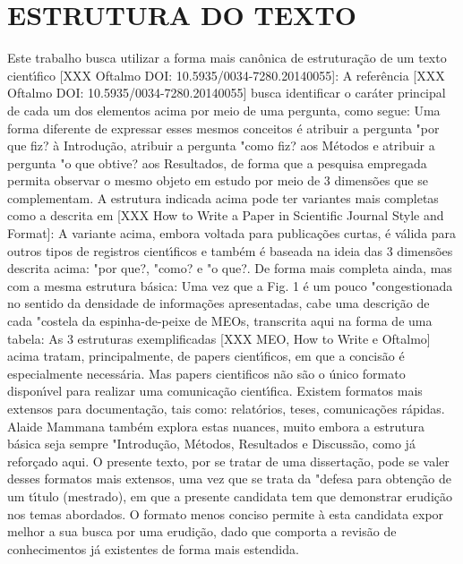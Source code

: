 \documentclass[
12pt,		%
openright,	%
twoside,  %
a4paper,			%
chapter=TITLE,		%
english,			%
french,				%
spanish,			%
brazil				%
]{USPSC-classe/USPSC}
\begin{document}


\chapter[ESTRUTURA DO TEXTO]{ESTRUTURA DO TEXTO}\label{ESTRUTURA DO TEXTO}
Este trabalho busca utilizar a forma mais can\^onica de estrutura\c{c}\~ao de um texto cient\'{\i}fico [XXX Oftalmo DOI: 10.5935/0034-7280.20140055]:
A refer\^encia [XXX Oftalmo DOI: 10.5935/0034-7280.20140055] busca identificar o car\'ater principal de cada um dos elementos acima por meio de uma pergunta, como segue:
Uma forma diferente de expressar esses mesmos conceitos \'e atribuir a pergunta "por que fiz? \`a Introdu\c{c}\~ao, atribuir a pergunta "como fiz? aos M\'etodos e atribuir a pergunta "o que obtive? aos Resultados, de forma que a pesquisa empregada permita observar o mesmo objeto em estudo por meio de 3 dimens\~oes que se complementam. 
A estrutura indicada acima pode ter variantes mais completas como a descrita em [XXX How to Write a Paper in Scientific Journal Style and Format]:
A variante acima, embora voltada para publica\c{c}\~oes curtas, \'e v\'alida para outros tipos de registros cient\'{\i}ficos e tamb\'em \'e baseada na ideia das 3 dimens\~oes descrita acima: "por que?, "como? e "o que?. 
De forma mais completa ainda, mas com a mesma estrutura b\'asica: 
Uma vez que a Fig. 1 \'e um pouco "congestionada no sentido da densidade de informa\c{c}\~oes apresentadas, cabe uma descri\c{c}\~ao de cada "costela da espinha-de-peixe de MEOs, transcrita aqui na forma de uma tabela:
As 3 estruturas exemplificadas [XXX MEO, How to Write e Oftalmo] acima tratam, principalmente, de papers cient\'{\i}ficos, em que a concis\~ao \'e especialmente necess\'aria. Mas papers cientificos n\~ao s\~ao o \'unico formato dispon\'{\i}vel para realizar uma comunica\c{c}\~ao cient\'{\i}fica. 
Existem formatos mais extensos para documenta\c{c}\~ao, tais como: relat\'orios, teses, comunica\c{c}\~oes r\'apidas. Alaide Mammana tamb\'em explora estas nuances, muito embora a estrutura b\'asica seja sempre "Introdu\c{c}\~ao, M\'etodos, Resultados e Discuss\~ao, como j\'a refor\c{c}ado aqui.
O presente texto, por se tratar de uma disserta\c{c}\~ao, pode se valer desses formatos mais extensos, uma vez que se trata da "defesa para obten\c{c}\~ao de um t\'{\i}tulo (mestrado), em que a presente candidata tem que demonstrar erudi\c{c}\~ao nos temas abordados. O formato menos conciso permite \`a esta candidata expor melhor a sua busca por uma erudi\c{c}\~ao, dado que comporta a revis\~ao de conhecimentos j\'a existentes de forma mais estendida.
\end{document}
